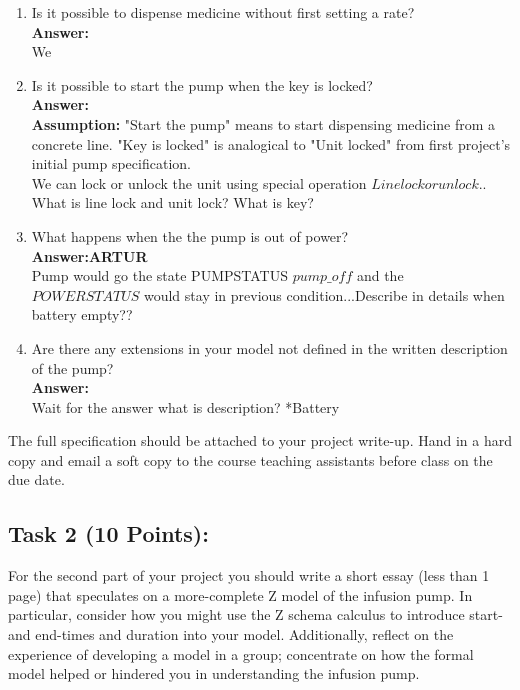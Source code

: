 \documentclass{article}
\newcommand{\head}{\subsection*}
\begin{document}
\begin{enumerate}
    \item Is it possible to dispense medicine without first
    setting a rate?
    \\
    \textbf{Answer:}\\
    We 
    
    \item Is it possible to start the pump when the key is locked?
    \\
    \textbf{Answer:}\\
    \textbf{Assumption:} "Start the pump" means to start dispensing medicine from a concrete line. "Key is locked" is analogical to "Unit locked" from first project's initial pump specification.\\
    We can lock or unlock the unit using special operation $Linelockorunlock$.. What is line lock and unit lock? What is key? 
    \item What happens when the the pump is out of power?
    \\
    \textbf{Answer:ARTUR}\\
    Pump would go the state PUMPSTATUS $pump\_off$ and the $POWERSTATUS$ would stay in previous condition...Describe in details when battery empty?? 
    \item Are there any extensions in your model not defined in
    the written description of the pump?
    \\
    \textbf{Answer:}\\
    Wait for the answer what is description? *Battery
\end{enumerate}

\noindent The full specification should be attached to your project
write-up. Hand in a hard copy and email a soft copy to the course
teaching assistants before class on the due date.

\head{Task 2 (10 Points):}

For the second part of your project you should write a short essay
(less than 1 page) that speculates on a more-complete Z model of the infusion pump. In particular, consider how you might use the Z schema calculus to introduce start- and end-times and duration into your model.
Additionally, reflect on the experience of developing a model in a
group; concentrate on how the formal model helped or hindered you in
understanding the infusion pump.
\end{document}
